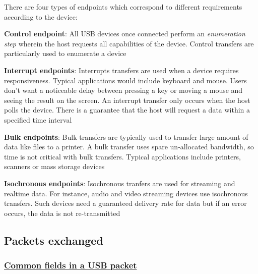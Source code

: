 \documentclass[pdftex,10pt,a4paper]{report}
\newenvironment{packed_item}{
\begin{itemize}
  \setlength{\itemsep}{1pt}
  \setlength{\parskip}{0pt}
  \setlength{\parsep}{0pt}
}{\end{itemize}}
\begin{document}
There are four types of endpoints which correspond to different requirements according to the device: 
\begin{packed_item}
	\item \textbf{Control endpoint}: All USB devices once connected perform an \textit{enumeration step} wherein the host requests all capabilities of the device. Control transfers are particularly used to enumerate a device
	\item \textbf{Interrupt endpoints}: Interrupts transfers are used when a device requires responsiveness. Typical applications would include keyboard and mouse. Users don't want a noticeable delay between pressing a key or moving a mouse and seeing the result on the screen. An interrupt transfer only occurs when the host polls the device. There is a guarantee that the host will request a data within a specified time interval
	\item \textbf{Bulk endpoints}: Bulk transfers are typically used to transfer large amount of data like files to a printer. A bulk transfer uses spare un-allocated bandwidth, so time is not critical with bulk transfers. Typical applications include printers, scanners or mass storage devices
	\item \textbf{Isochronous endpoints}: Isochronous tranfers are used for streaming and realtime data. For instance, audio and video streaming devices use isochronous transfers. Such devices need a guaranteed delivery rate for data but if an error occurs, the data is not re-transmitted
\end{packed_item}
	

\subsection{Packets exchanged}
\subsubsection{\underline{Common fields in a USB packet}}
\end{document}
